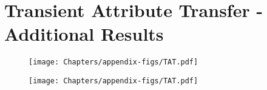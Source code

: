 \chapter{Transient Attribute Transfer - Additional Results}
\label{TAT:add_res}


\begin{figure}[ht]
  \centering
  {\texttt{[image: Chapters/appendix-figs/TAT.pdf]}}

   \caption{}
   \label{fig:appendix-tat}
\end{figure}

\begin{figure}[ht]
  \centering

  {\texttt{[image: Chapters/appendix-figs/TAT.pdf]}}

   \caption{}
   \label{fig:appendix-tat}
\end{figure}


